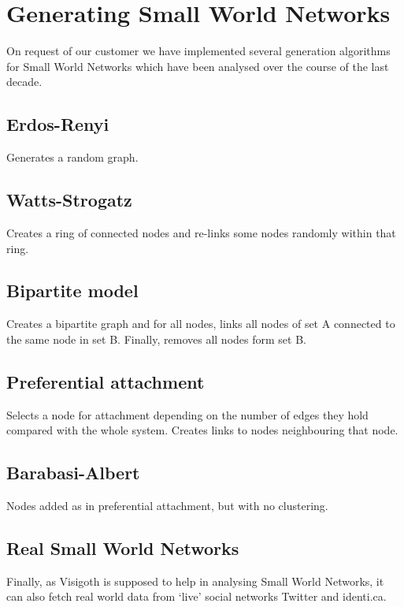 \documentclass[a4paper,11pt,titlepage]{article}
\let\stdsection\section         %
\renewcommand{\section}{\newpage\stdsection}
\begin{document}
\section{Generating Small World Networks}

On request of our customer we have implemented several generation
algorithms for Small World Networks which have been analysed over
the course of the last decade.

\subsection{Erdos-Renyi}
Generates a random graph.

\subsection{Watts-Strogatz}
Creates a ring of connected nodes and re-links some nodes randomly
within that ring.

\subsection{Bipartite model}
Creates a bipartite graph and for all nodes, links all nodes of
set A connected to the same node in set B. Finally, removes all
nodes form set B.

\subsection{Preferential attachment}
Selects a node for attachment depending on the number of edges
they hold compared with the whole system. Creates links to nodes
neighbouring that node.

\subsection{Barabasi-Albert}
Nodes added as in preferential attachment, but with no clustering.

\subsection{Real Small World Networks}
Finally, as Visigoth is supposed to help in analysing Small World
Networks, it can also fetch real world data from `live' social
networks Twitter and identi.ca.
\end{document}
